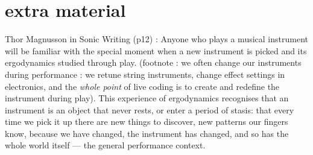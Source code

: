 \section{extra material}
Thor Magnusson in Sonic Writing (p12) : Anyone who plays a musical instrument will be familiar with the special moment when a new instrument is picked and its ergodynamics studied through play. (footnote : we often change our instruments during performance : we retune string instruments, change effect settings in electronics, and the \textit{whole point} of live coding is to create and redefine the instrument during play). This experience of ergodynamics recognises that an instrument is an object that never rests, or enter a period of stasis: that every time we pick it up there are new things to discover, new patterns our fingers know, because we have changed, the instrument has changed, and so has the whole world itself — the general performance context.

